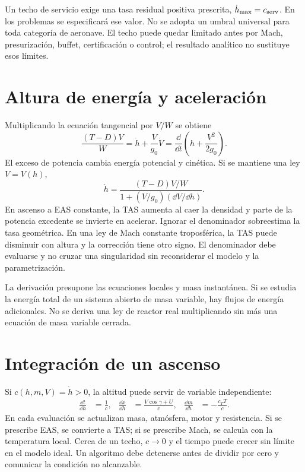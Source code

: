 Un techo de servicio exige una tasa residual positiva prescrita, $\dot h_{\max}=c_{\rm serv}$. En los problemas se especificará ese valor. No se adopta un umbral universal para toda categoría de aeronave. El techo puede quedar limitado antes por Mach, presurización, buffet, certificación o control; el resultado analítico no sustituye esos límites.


\section{Altura de energía y aceleración}
Multiplicando la ecuación tangencial por $V/W$ se obtiene
\begin{equation}
\frac{(T-D)V}{W}=\dot h+\frac{V}{g_0}\dot V
=\frac{\dd}{\dd t}\left(h+\frac{V^2}{2g_0}\right).
\label{eq:energyheight}
\end{equation}
El exceso de potencia cambia energía potencial y cinética. Si se mantiene una ley $V=V(h)$,
\begin{equation}
\dot h=\frac{(T-D)V/W}{1+(V/g_0)(\dd V/\dd h)}.
\label{eq:climb-acceleration}
\end{equation}
En ascenso a EAS constante, la TAS aumenta al caer la densidad y parte de la potencia excedente se invierte en acelerar. Ignorar el denominador sobreestima la tasa geométrica. En una ley de Mach constante troposférica, la TAS puede disminuir con altura y la corrección tiene otro signo. El denominador debe evaluarse y no cruzar una singularidad sin reconsiderar el modelo y la parametrización.

La derivación presupone las ecuaciones locales y masa instantánea. Si se estudia la energía total de un sistema abierto de masa variable, hay flujos de energía adicionales. No se deriva una ley de reactor real multiplicando sin más una ecuación de masa variable cerrada.

\section{Integración de un ascenso}
Si $c(h,m,V)=\dot h>0$, la altitud puede servir de variable independiente:
\begin{align}
\frac{\dd t}{\dd h}&=\frac1c,&
\frac{\dd x}{\dd h}&=\frac{V\cos\gamma+U}{c},&
\frac{\dd m}{\dd h}&=-\frac{c_TT}{c}.
\label{eq:climb-integral}
\end{align}
En cada evaluación se actualizan masa, atmósfera, motor y resistencia. Si se prescribe EAS, se convierte a TAS; si se prescribe Mach, se calcula con la temperatura local. Cerca de un techo, $c\to0$ y el tiempo puede crecer sin límite en el modelo ideal. Un algoritmo debe detenerse antes de dividir por cero y comunicar la condición no alcanzable.

